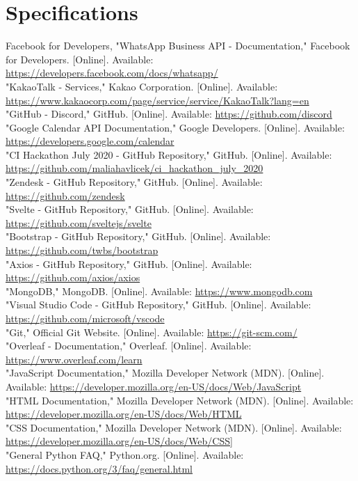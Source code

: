 \documentclass[conference]{IEEEtran}
\begin{document}
\section{Specifications}


\begin{thebibliography}{00}
 Facebook for Developers, "WhatsApp Business API - Documentation," Facebook for Developers. [Online]. Available: \url{https://developers.facebook.com/docs/whatsapp/}\\
 "KakaoTalk - Services," Kakao Corporation. [Online]. Available: \url{https://www.kakaocorp.com/page/service/service/KakaoTalk?lang=en}\\
 "GitHub - Discord," GitHub. [Online]. Available: \url{https://github.com/discord}\\
 "Google Calendar API Documentation," Google Developers. [Online]. Available: \url{https://developers.google.com/calendar}\\
 "CI Hackathon July 2020 - GitHub Repository," GitHub. [Online]. Available: \url{https://github.com/maliahavlicek/ci\_hackathon\_july\_2020}\\
 "Zendesk - GitHub Repository," GitHub. [Online]. Available: \url{https://github.com/zendesk}\\
 "Svelte - GitHub Repository," GitHub. [Online]. Available: \url{https://github.com/sveltejs/svelte}\\
 "Bootstrap - GitHub Repository," GitHub. [Online]. Available: \url{https://github.com/twbs/bootstrap}\\
 "Axios - GitHub Repository," GitHub. [Online]. Available: \url{https://github.com/axios/axios}\\
 "MongoDB," MongoDB. [Online]. Available: \url{https://www.mongodb.com}\\
 "Visual Studio Code - GitHub Repository," GitHub. [Online]. Available: \url{https://github.com/microsoft/vscode}\\
 "Git," Official Git Website. [Online]. Available: \url{https://git-scm.com/}\\
 "Overleaf - Documentation," Overleaf. [Online]. Available: \url{https://www.overleaf.com/learn}\\
 "JavaScript Documentation," Mozilla Developer Network (MDN). [Online]. Available: \url{https://developer.mozilla.org/en-US/docs/Web/JavaScript}\\
 "HTML Documentation," Mozilla Developer Network (MDN). [Online]. Available: \url{https://developer.mozilla.org/en-US/docs/Web/HTML}\\
 "CSS Documentation," Mozilla Developer Network (MDN). [Online]. Available: \url{https://developer.mozilla.org/en-US/docs/Web/CSS]}\\
 "General Python FAQ," Python.org. [Online]. Available: \url{https://docs.python.org/3/faq/general.html}\\
\end{thebibliography}
\end{document}
